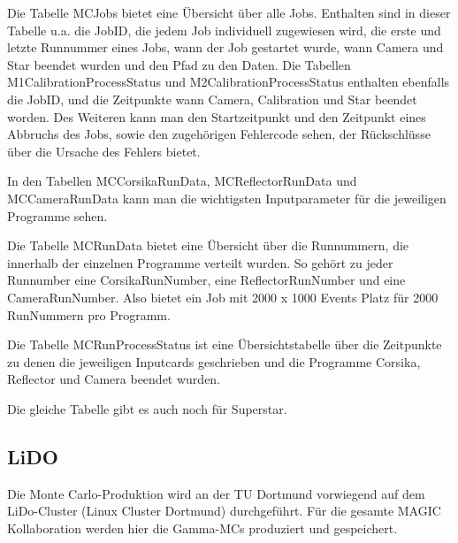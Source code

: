 
Die Tabelle MCJobs bietet eine Übersicht über alle Jobs. 
Enthalten sind in dieser Tabelle u.a. die JobID, die jedem Job individuell zugewiesen wird, die erste und letzte Runnummer eines Jobs, wann der Job gestartet wurde, wann Camera und Star beendet wurden und den Pfad zu den Daten.\newline
Die Tabellen M1CalibrationProcessStatus und M2CalibrationProcessStatus enthalten ebenfalls die JobID, und die Zeitpunkte wann Camera, Calibration und Star beendet worden. 
Des Weiteren kann man den Startzeitpunkt und den Zeitpunkt eines Abbruchs des Jobs, sowie den zugehörigen Fehlercode sehen, der Rückschlüsse über die Ursache des Fehlers bietet.

In den Tabellen MCCorsikaRunData, MCReflectorRunData und MCCameraRunData kann man die wichtigsten Inputparameter für die jeweiligen Programme sehen.

Die Tabelle MCRunData bietet eine Übersicht über die Runnummern, die innerhalb der einzelnen Programme verteilt wurden. 
So gehört zu jeder Runnumber eine CorsikaRunNumber, eine ReflectorRunNumber und eine CameraRunNumber.
Also bietet ein Job mit 2000 x 1000 Events Platz für 2000 RunNummern pro Programm.

Die Tabelle MCRunProcessStatus ist eine Übersichtstabelle über die Zeitpunkte zu denen die jeweiligen Inputcards geschrieben und die Programme Corsika, Reflector und Camera beendet wurden.

Die gleiche Tabelle gibt es auch noch für Superstar. 


\subsection{LiDO}
Die Monte Carlo-Produktion wird an der TU Dortmund vorwiegend auf dem LiDo-Cluster (Linux Cluster Dortmund) durchgeführt. 
Für die gesamte MAGIC Kollaboration werden hier die Gamma-MCs produziert und gespeichert.

